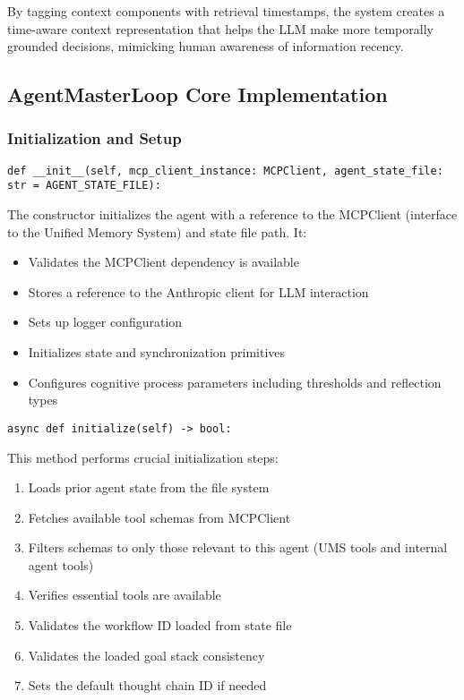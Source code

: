 \documentclass[12pt,a4paper]{article}
\begin{document}
By tagging context components with retrieval timestamps, the system creates a time-aware context representation that helps the LLM make more temporally grounded decisions, mimicking human awareness of information recency.

\subsection*{AgentMasterLoop Core Implementation}

\subsubsection*{Initialization and Setup}
\begin{pageablecode}
\begin{verbatim}
def __init__(self, mcp_client_instance: MCPClient, agent_state_file: str = AGENT_STATE_FILE):
\end{verbatim}
\end{pageablecode}
The constructor initializes the agent with a reference to the MCPClient (interface to the Unified Memory System) and state file path. It:
\begin{itemize}
    \item Validates the MCPClient dependency is available
    \item Stores a reference to the Anthropic client for LLM interaction
    \item Sets up logger configuration
    \item Initializes state and synchronization primitives
    \item Configures cognitive process parameters including thresholds and reflection types
\end{itemize}

\begin{pageablecode}
\begin{verbatim}
async def initialize(self) -> bool:
\end{verbatim}
\end{pageablecode}
This method performs crucial initialization steps:
\begin{enumerate}[label=\arabic*.]
    \item Loads prior agent state from the file system
    \item Fetches available tool schemas from MCPClient
    \item Filters schemas to only those relevant to this agent (UMS tools and internal agent tools)
    \item Verifies essential tools are available
    \item Validates the workflow ID loaded from state file
    \item Validates the loaded goal stack consistency
    \item Sets the default thought chain ID if needed
\end{enumerate}
\end{document}
